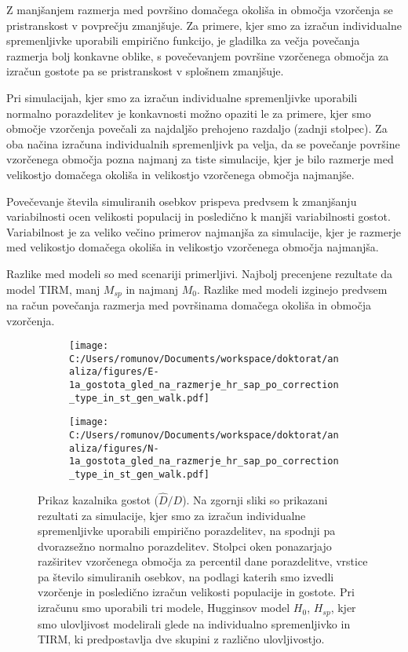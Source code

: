 Z manjšanjem razmerja med površino domačega okoliša in območja vzorčenja se pristranskost v povprečju zmanjšuje. Za primere, kjer smo za izračun individualne spremenljivke uporabili empirično funkcijo, je gladilka za večja povečanja razmerja bolj konkavne oblike, s povečevanjem površine vzorčenega območja za izračun gostote pa se pristranskost v splošnem zmanjšuje.

Pri simulacijah, kjer smo za izračun individualne spremenljivke uporabili normalno porazdelitev je konkavnosti  možno opaziti le za primere, kjer smo območje vzorčenja povečali za najdaljšo prehojeno razdaljo (zadnji stolpec).
Za oba načina izračuna individualnih spremenljivk pa velja, da se povečanje površine vzorčenega območja pozna najmanj za tiste simulacije, kjer je bilo razmerje med velikostjo domačega okoliša in velikostjo vzorčenega območja najmanjše.

Povečevanje števila simuliranih osebkov prispeva predvsem k zmanjšanju variabilnosti ocen velikosti populacij in posledično k manjši variabilnosti gostot. Variabilnost je za veliko večino primerov najmanjša za simulacije, kjer je razmerje med velikostjo domačega okoliša in velikostjo vzorčenega območja najmanjša.

Razlike med modeli so med scenariji primerljivi. Najbolj precenjene rezultate da model TIRM, manj $M_{sp}$ in najmanj $M_0$. Razlike med modeli izginejo predvsem na račun povečanja razmerja med površinama domačega okoliša in območja vzorčenja.

\begin{figure}[H]
  \centering
  \begin{subfigure}[b]{1\textwidth}
    \centering
    \texttt{[image: C:/Users/romunov/Documents/workspace/doktorat/analiza/figures/E-1a\_gostota\_gled\_na\_razmerje\_hr\_sap\_po\_correction\_type\_in\_st\_gen\_walk.pdf]}
    \label{sli:sub7.1}
  \end{subfigure}

  \begin{subfigure}[b]{1\textwidth}
    \centering
    \texttt{[image: C:/Users/romunov/Documents/workspace/doktorat/analiza/figures/N-1a\_gostota\_gled\_na\_razmerje\_hr\_sap\_po\_correction\_type\_in\_st\_gen\_walk.pdf]}
    \label{sli:sub7.2}
  \end{subfigure}
  \caption[Prikaz kazalnika gostot ($\hat{D}/D$)]{Prikaz kazalnika gostot ($\hat{D}/D$). Na zgornji sliki so prikazani rezultati za simulacije, kjer smo za izračun individualne spremenljivke uporabili empirično porazdelitev, na spodnji pa dvorazsežno normalno porazdelitev. Stolpci oken ponazarjajo razširitev vzorčenega območja za percentil dane porazdelitve, vrstice pa število simuliranih osebkov, na podlagi katerih smo izvedli vzorčenje in posledično izračun velikosti populacije in gostote. Pri izračunu smo uporabili tri modele, Hugginsov model $H_0$, $H_{sp}$, kjer smo ulovljivost modelirali glede na individualno spremenljivko in TIRM, ki predpostavlja dve skupini z različno ulovljivostjo.}
  \label{sli:slika7}
\end{figure}

